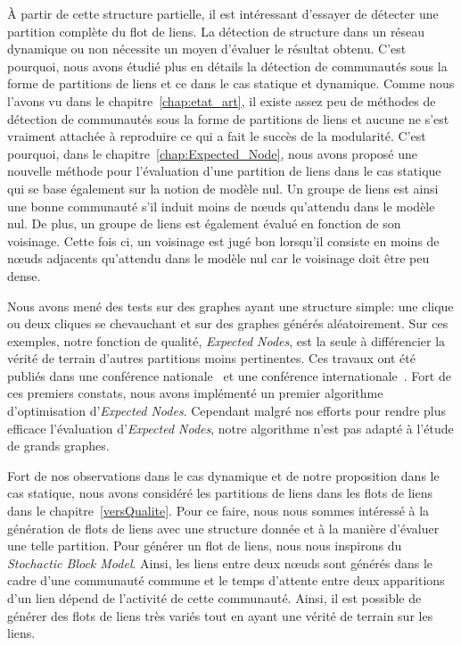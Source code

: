 \bigskip

\`A partir de cette structure partielle, il est intéressant d'essayer de détecter une partition complète du flot de liens.
La détection de structure dans un réseau dynamique ou non nécessite un moyen d'évaluer le résultat obtenu.
C'est pourquoi, nous avons étudié plus en détails la détection de communautés sous la forme de partitions de liens et ce dans le cas statique et dynamique.
Comme nous l'avons vu dans le chapitre~\ref{chap:etat_art}, il existe assez peu de méthodes de détection de communautés sous la forme de partitions de liens et aucune ne s'est vraiment attachée à reproduire ce qui a fait le succès de la modularité.
C'est pourquoi, dans le chapitre~\ref{chap:Expected_Node}, nous avons proposé une nouvelle méthode pour l'évaluation d'une partition de liens dans le cas statique qui se base également sur la notion de modèle nul.
Un groupe de liens est ainsi une bonne communauté s'il induit moins de n\oe{}uds qu'attendu dans le modèle nul.
De plus, un groupe de liens est également évalué en fonction de son voisinage.
Cette fois ci, un voisinage est jugé bon lorsqu'il consiste en moins de n\oe{}uds adjacents qu'attendu dans le modèle nul car le voisinage doit être peu dense.

Nous avons mené des tests sur des graphes ayant une structure simple: une clique ou deux cliques se chevauchant et sur des graphes générés aléatoirement.
Sur ces exemples, notre fonction de qualité, \emph{Expected Nodes}, est la seule à différencier la vérité de terrain d'autres partitions moins pertinentes.
Ces travaux ont été publiés dans une conférence nationale~\cite{Gaumont2014} et une conférence internationale~\cite{Gaumont2015}.
Fort de ces premiers constats, nous avons implémenté un premier algorithme d'optimisation d'\emph{Expected Nodes}.
Cependant malgré nos efforts pour rendre plus efficace l'évaluation d'\emph{Expected Nodes}, notre algorithme n'est pas adapté à l'étude de grands graphes.

\bigskip

Fort de nos observations dans le cas dynamique et de notre proposition dans le cas statique, nous avons considéré les partitions de liens dans les flots de liens dans le chapitre~\ref{versQualite}.
Pour ce faire, nous nous sommes intéressé à la génération de flots de liens avec une structure donnée et à la manière d'évaluer une telle partition.
Pour générer un flot de liens, nous nous inspirons du \emph{Stochactic Block Model}.
Ainsi, les liens entre deux n\oe{}uds sont générés dans le cadre d'une communauté commune et le temps d'attente entre deux apparitions d'un lien dépend de l'activité de cette communauté.
Ainsi, il est possible de générer des flots de liens très variés tout en ayant une vérité de terrain sur les liens.

